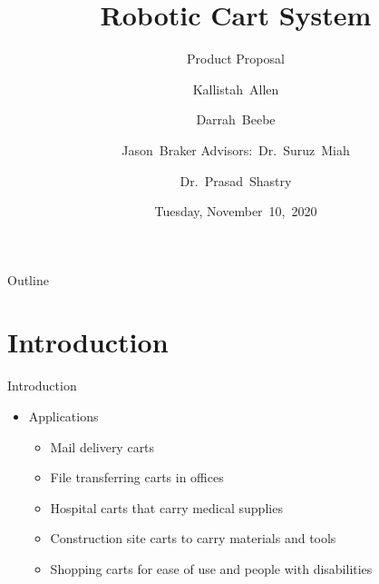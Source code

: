 \documentclass{beamer}
\title[Robotic Cart System (Proposal)]{Robotic Cart System}
\subtitle{Product Proposal}
\author[K.~Allen, D.~Beebe, J.~Braker]{Kallistah~Allen \and Darrah~Beebe \and
Jason~Braker
Advisors:~Dr.~Suruz~Miah \and Dr.~Prasad~Shastry}
\institute[Bradley University] %
{
  Department of Electrical and Computer Engineering\\
  Bradley University\\
  1501 W. Bradley Avenue\\
  Peoria, IL, 61625, USA
}
\date[November~10,~2020]{Tuesday, November~10,~2020}
\begin{document}
\begin{frame}
  \titlepage
\end{frame}

\begin{frame}{Outline} 
  \tableofcontents%
\end{frame}

\section{Introduction}

\begin{frame}{Introduction}{}
    \begin{itemize}
        \item Applications
            \begin{itemize}
                \item Mail delivery carts
                \item File transferring carts in offices
                \item Hospital carts that carry medical supplies
                \item Construction site carts to carry materials and tools
                \item Shopping carts for ease of use and people with disabilities
            \end{itemize}
    \end{itemize}
\end{frame}
\end{document}
